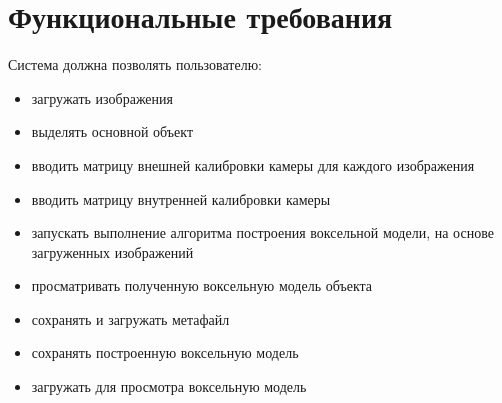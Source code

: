 \section{Функциональные требования}
Система должна позволять пользователю:
\begin{itemize}
\item загружать изображения
\item выделять основной объект
\item вводить матрицу внешней калибровки камеры для каждого изображения
\item вводить матрицу внутренней калибровки камеры
\item запускать выполнение алгоритма построения воксельной модели, на основе загруженных изображений
\item просматривать полученную воксельную модель объекта
\item сохранять и загружать метафайл
\item сохранять построенную воксельную модель
\item загружать для просмотра воксельную модель
\end{itemize}


